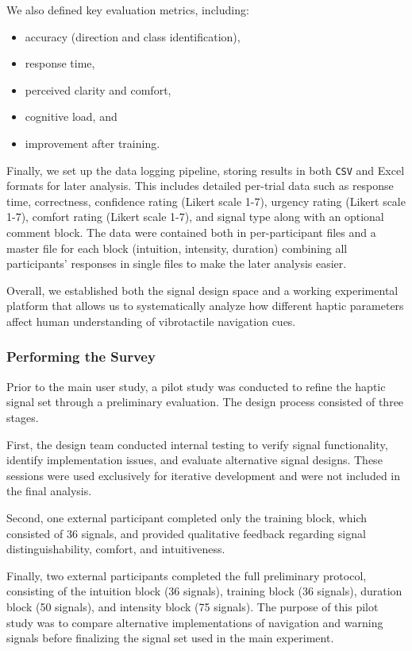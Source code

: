 \documentclass[12pt]{report}
\begin{document}
We also defined key evaluation metrics, including:
\begin{itemize}
    \item accuracy (direction and class identification),
    \item response time,
    \item perceived clarity and comfort,
    \item cognitive load, and
    \item improvement after training.
\end{itemize}

Finally, we set up the data logging pipeline, storing results in both \texttt{CSV} and Excel formats for later analysis. This includes detailed per-trial data such as response time, correctness, confidence rating (Likert scale 1-7), urgency rating (Likert scale 1-7), comfort rating (Likert scale 1-7), and signal type along with an optional comment block. The data were contained both in per-participant files and a master file for each block (intuition, intensity, duration) combining all participants' responses in single files to make the later analysis easier.

Overall, we established both the signal design space and a working experimental platform that allows us to systematically analyze how different haptic parameters affect human understanding of vibrotactile navigation cues.

\subsubsection{Performing the Survey}

Prior to the main user study, a pilot study was conducted to refine the haptic signal set through a preliminary evaluation. The design process consisted of three stages.

First, the design team conducted internal testing to verify signal functionality, identify implementation issues, and evaluate alternative signal designs. These sessions were used exclusively for iterative development and were not included in the final analysis.

Second, one external participant completed only the training block, which consisted of 36 signals, and provided qualitative feedback regarding signal distinguishability, comfort, and intuitiveness.

Finally, two external participants completed the full preliminary protocol, consisting of the intuition block (36 signals), training block (36 signals), duration block (50 signals), and intensity block (75 signals). The purpose of this pilot study was to compare alternative implementations of navigation and warning signals before finalizing the signal set used in the main experiment.
\end{document}
